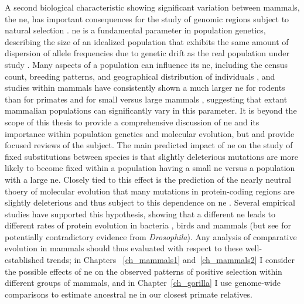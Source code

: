 A second biological characteristic showing significant variation
between mammals, the \ac{ne}, has important consequences for the study
of genomic regions subject to natural selection
\citep{Charlesworth2009}. \ac{ne} is a fundamental parameter in
population genetics, describing the size of an idealized population
that exhibits the same amount of dispersion of allele frequencies due
to genetic drift as the real population under study
\citep{Wright1931,Woolfit2009}. Many aspects of a population can
influence its \ac{ne}, including the census count, breeding patterns,
and geographical distribution of individuals \citep{Caballero1994},
and studies within mammals have consistently shown a much larger
\ac{ne} for rodents than for primates and for small versus large
mammals \citep{EyreWalker2002,Popadin2007,Halligan2010}, suggesting
that extant mammalian populations can significantly vary in this
parameter. It is beyond the scope of this thesis to provide a
comprehensive discussion of \ac{ne} and its importance within
population genetics and molecular evolution, but \citet{Woolfit2009}
and \citet{Charlesworth2009} provide focused reviews of the
subject. The main predicted impact of \ac{ne} on the study of fixed
substitutions between species is that slightly deleterious mutations
are more likely to become fixed within a population having a small
\ac{ne} versus a population with a large \ac{ne}. Closely tied to this
effect is the prediction of the nearly neutral thoery of molecular
evolution \citep{Kimura1985} that many mutations in protein-coding
regions are slightly deleterious and thus subject to this dependence
on \ac{ne} \citep{Kimura1974a,Kimura1985,Ohta1992}. Several empirical
studies have supported this hypothesis, showing that a different
\ac{ne} leads to different rates of protein evolution in bacteria
\citep{Moran2008,Warnecke2011}, birds \citep{Axelsson2009} and mammals
\citep{Kosiol2008,Ellegren2009} (but see \citet{Bachtrog2008} for
potentially contradictory evidence from \emph{Drosophila}). Any
analysis of comparative evolution in mammals should thus evaluated
with respect to these well-established trends; in Chapters~
\ref{ch_mammals1} and~\ref{ch_mammals2} I consider the possible
effects of \ac{ne} on the observed patterns of positive selection
within different groups of mammals, and in Chapter~\ref{ch_gorilla} I
use genome-wide comparisons to estimate ancestral \ac{ne} in our
closest primate relatives.

